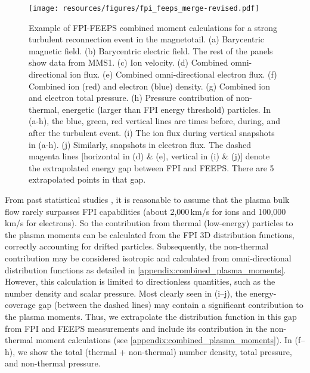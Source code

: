 \documentclass[draft]{agujournal2019}
\begin{document}
\begin{figure}
\centering
\noindent\texttt{[image: resources/figures/fpi\_feeps\_merge-revised.pdf]}
\caption{
    Example of FPI-FEEPS combined moment calculations for a strong turbulent reconnection event in the magnetotail. (a) Barycentric magnetic field. (b) Barycentric electric field. The rest of the panels show data from MMS1. (c) Ion velocity. (d) Combined omni-directional ion  flux. (e) Combined omni-directional electron  flux. (f) Combined ion (red) and electron (blue) density. (g) Combined ion and electron total pressure. (h) Pressure contribution of non-thermal, energetic (larger than FPI energy threshold) particles. In (a-h), the blue, green, red vertical lines are times before, during, and after the turbulent event. (i) The ion  flux during vertical snapshots in (a-h). (j) Similarly, snapshots in electron  flux.  The dashed magenta lines [horizontal in (d) \& (e), vertical in (i) \& (j)] denote the extrapolated energy gap between FPI and FEEPS. There are 5 extrapolated points in that gap.
}
\label{fig:motivating_event}
\end{figure}

From past statistical studies \cite{Huang2020,Chong2022}, it is reasonable to assume that the plasma bulk flow rarely surpasses FPI capabilities (about 2,000\,\si{km/s} for ions and 100,000\,\si{km/s} for electrons). So the contribution from thermal (low-energy) particles to the plasma moments can be calculated from the FPI 3D distribution functions, correctly accounting for drifted particles. Subsequently, the non-thermal contribution may be considered isotropic and calculated from omni-directional distribution functions as detailed in \ref{appendix:combined_plasma_moments}. However, this calculation is limited to directionless quantities, such as the number density and scalar pressure. Most clearly seen in (i--j), the energy-coverage gap (between the dashed lines) may contain a significant contribution to the plasma moments. Thus, we extrapolate the distribution function in this gap from FPI and FEEPS measurements and include its contribution in the non-thermal moment calculations (see \ref{appendix:combined_plasma_moments}). In (f--h), we show the total (thermal + non-thermal) number density, total pressure, and non-thermal pressure.
\end{document}
